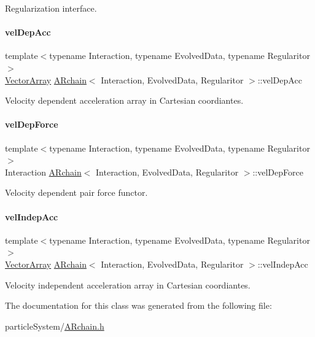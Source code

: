 Regularization interface. 

\mbox{\label{class_a_rchain_a3c3a74f839bbfe5cbe1d8eb239dd8cc1}} 
\paragraph{\texorpdfstring{vel\+Dep\+Acc}{velDepAcc}}
{\footnotesize\ttfamily template$<$typename Interaction, typename Evolved\+Data, typename Regularitor$>$ \\
\mbox{\hyperlink{class_a_rchain_a019fbadb9f4e5892736d9127537338bb}{Vector\+Array}} \mbox{\hyperlink{class_a_rchain}{A\+Rchain}}$<$ Interaction, Evolved\+Data, Regularitor $>$\+::vel\+Dep\+Acc\hspace{0.3cm}{\ttfamily [private]}}



Velocity dependent acceleration array in Cartesian coordiantes. 

\mbox{\label{class_a_rchain_a5ad11cefbdb69a58225b799b36dd9eee}} 
\paragraph{\texorpdfstring{vel\+Dep\+Force}{velDepForce}}
{\footnotesize\ttfamily template$<$typename Interaction, typename Evolved\+Data, typename Regularitor$>$ \\
Interaction \mbox{\hyperlink{class_a_rchain}{A\+Rchain}}$<$ Interaction, Evolved\+Data, Regularitor $>$\+::vel\+Dep\+Force\hspace{0.3cm}{\ttfamily [private]}}



Velocity dependent pair force functor. 

\mbox{\label{class_a_rchain_a9359b4fb9f08ad849b0f1dfbdf661016}} 
\paragraph{\texorpdfstring{vel\+Indep\+Acc}{velIndepAcc}}
{\footnotesize\ttfamily template$<$typename Interaction, typename Evolved\+Data, typename Regularitor$>$ \\
\mbox{\hyperlink{class_a_rchain_a019fbadb9f4e5892736d9127537338bb}{Vector\+Array}} \mbox{\hyperlink{class_a_rchain}{A\+Rchain}}$<$ Interaction, Evolved\+Data, Regularitor $>$\+::vel\+Indep\+Acc\hspace{0.3cm}{\ttfamily [private]}}



Velocity independent acceleration array in Cartesian coordiantes. 



The documentation for this class was generated from the following file\+:\begin{DoxyCompactItemize}
\item 
particle\+System/\mbox{\hyperlink{_a_rchain_8h}{A\+Rchain.\+h}}\end{DoxyCompactItemize}
